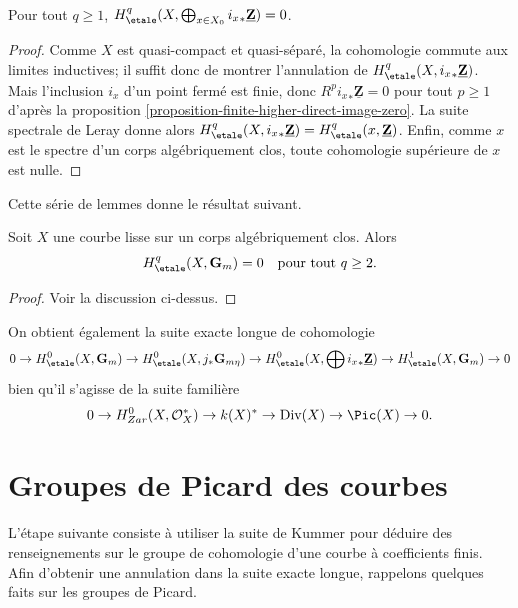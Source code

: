 \begin{lemma}
\label{lemma-cohomology-istar-Z}
Pour tout $q \geq 1$, $H_\etale^q(X, \bigoplus_{x \in X_0} {i_x}_*
\underline{\mathbf{Z}}) = 0$.
\end{lemma}

\begin{proof}
Comme $X$ est quasi-compact et quasi-séparé, la cohomologie commute aux limites inductives;
il suffit donc de montrer l'annulation de $H_\etale^q(X, {i_x}_*
\underline{\mathbf{Z}})$. Mais l'inclusion $i_x$ d'un point fermé est
finie, donc $R^p {i_x}_* \underline{\mathbf{Z}} = 0$ pour tout $p \geq 1$ d'après la
proposition \ref{proposition-finite-higher-direct-image-zero}.
La suite spectrale de Leray donne alors
$H_\etale^q(X, {i_x}_* \underline{\mathbf{Z}}) =
H_\etale^q(x, \underline{\mathbf{Z}})$.
Enfin, comme $x$ est le spectre d'un
corps algébriquement clos, toute cohomologie supérieure de $x$ est nulle.
\end{proof}

\noindent
Cette série de lemmes donne le résultat suivant.

\begin{theorem}
\label{theorem-vanishing-cohomology-Gm-curve}
Soit $X$ une courbe lisse sur un corps algébriquement clos. Alors
$$
H_\etale^q(X, \mathbf{G}_m) = 0 \ \ \text{ pour tout } q \geq 2.
$$
\end{theorem}

\begin{proof}
Voir la discussion ci-dessus.
\end{proof}

\noindent
On obtient également la suite exacte longue de cohomologie
$$
0 \to
H_\etale^0(X, \mathbf{G}_m) \to
H_\etale^0(X, j_*\mathbf{G}_{m\eta}) \to
H_\etale^0(X, \bigoplus {i_x}_*\underline{\mathbf{Z}}) \to
H_\etale^1(X, \mathbf{G}_m) \to 0
$$
bien qu'il s'agisse de la suite familière
$$
0 \to H_{Zar}^0(X, \mathcal{O}_X^*) \to k(X)^* \to \text{Div}(X)
\to \Pic(X) \to 0.
$$





\section{Groupes de Picard des courbes}
\label{section-pic-curves}

\noindent
L'étape suivante consiste à utiliser la suite de Kummer pour déduire des renseignements
sur le groupe de cohomologie d'une courbe à coefficients finis. Afin
d'obtenir une annulation dans la suite exacte longue, rappelons quelques faits sur les
groupes de Picard.

